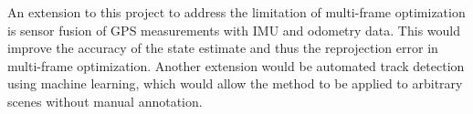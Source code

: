 An extension to this project to address the limitation of multi-frame optimization is sensor fusion of GPS measurements with IMU and odometry data. This would improve the accuracy of the state estimate and thus the reprojection error in multi-frame optimization. Another extension would be automated track detection using machine learning, which would allow the method to be applied to arbitrary scenes without manual annotation.

